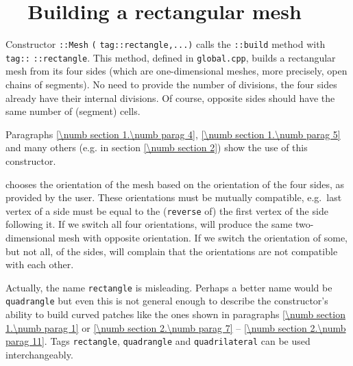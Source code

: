 \section{~~Building a rectangular mesh}\label{\numb section 12.\numb parag 3}

Constructor {\small\tt {}::Mesh} {\small\tt(}
{\small\tt\textcolor{tag}{tag}::rectangle,...)} calls the {\small\tt{}::build} method
with {\small\tt \textcolor{tag}{tag}::} {\small\tt::rectangle}.
This method, defined in {\small\tt global.cpp}, builds a rectangular mesh from its
four sides (which are one-dimensional meshes, more precisely, open chains of segments).
No need to provide the number of divisions, the four sides already have their internal divisions.
Of course, opposite sides should have the same number of (segment) cells.

Paragraphs \ref{\numb section 1.\numb parag 4}, \ref{\numb section 1.\numb parag 5} and
many others (e.g. in section \ref{\numb section 2}) show the use of this constructor.

{\ManiFEM} chooses the orientation of the mesh based on the orientation of the four sides,
as provided by the user.
These orientations must be mutually compatible, e.g.\ last vertex of a side must be equal to
the ({\small\tt reverse} of) the first vertex of the side following it.
If we switch all four orientations, {\maniFEM} will produce the same two-dimensional mesh
with opposite orientation.
If we switch the orientation of some, but not all, of the sides, {\maniFEM} will complain
that the orientations are not compatible with each other.

Actually, the name {\small\tt rectangle} is misleading.
Perhaps a better name would be {\small\tt quadrangle} but even this is not general enough to
describe the constructor's ability to build curved patches like the ones shown in paragraphs
\ref{\numb section 1.\numb parag 1} or \ref{\numb section 2.\numb parag 7} --
\ref{\numb section 2.\numb parag 11}.
Tags {\small\tt rectangle}, {\small\tt quadrangle} and {\small\tt quadrilateral} can be used
interchangeably.

